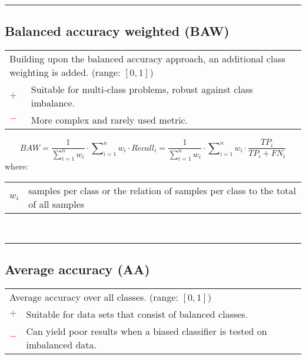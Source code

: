 \documentclass{article}
\makeatletter
\newenvironment{conditions}[1][where:]
	{\hspace{0.02\textwidth} #1 \begin{tabular}[t]{>{$}l<{$} @{${}={}$} l}}
	{\end{tabular}\\[\belowdisplayskip]}
\makeatother
\begin{document}
\hrule


\subsection[Balanced accuracy weighted (BAW)]{Balanced accuracy weighted (BAW) \cite{salman2017detection, infante2023factors}}

\begin{table}[H]\centering
	\begin{tabular}{m{}m{}}
		\multicolumn{2}{m{0.95\textwidth}}{Building upon the balanced accuracy approach, an additional class weighting is added. (range: $[0, 1]$)} \\
		\textcolor{Green}{$+$} & Suitable for multi-class problems, robust against class imbalance. \\
		\textcolor{Red}{$-$}   & More complex and rarely used metric.
	\end{tabular}
\end{table}

\begin{equation}
	\textit{BAW} = \dfrac{1}{\sum\nolimits_{i = 1}^n w_i} \cdot \sum\nolimits_{i = 1}^n w_i \cdot \textit{Recall}_i = \dfrac{1}{\sum\nolimits_{i = 1}^n w_i} \cdot \sum\nolimits_{i = 1}^n w_i \cdot \dfrac{\textit{TP}_i}{\textit{TP}_i + \textit{FN}_i}
%
	\label{equation:BAW}
\end{equation}
%
\begin{conditions}
	w_i & samples per class or the relation of samples per class to the total of all samples
\end{conditions}

\hrule


\subsection[Average accuracy (AA)]{Average accuracy (AA) \cite{brodersen2010balanced, huang2019ecg}}

\begin{table}[H]\centering
	\begin{tabular}{m{}m{}}
		\multicolumn{2}{m{0.95\textwidth}}{Average accuracy over all classes. (range: $[0, 1]$)} \\
		\textcolor{Green}{$+$} & Suitable for data sets that consist of balanced classes. \\
		\textcolor{Red}{$-$}   & Can yield poor results when a biased classifier is tested on imbalanced data.
	\end{tabular}
\end{table}
\end{document}
